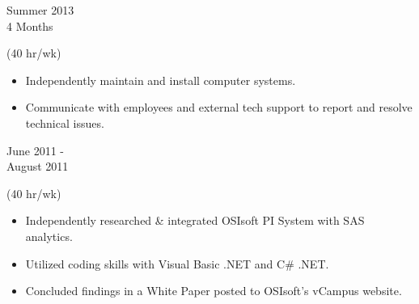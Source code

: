 %


\flushleft \begin{minipage}[t]{\dateColWidth}
Summer 2013 \\
4 Months
\end{minipage}
\begin{minipage}[t]{0.8\textwidth}
 (40 hr/wk) \\[-1 em]
\begin{adjustwidth}{2.5 em}{0 em}

\begin{itemize} \itemsep-2pt
\setlength{\itemindent}{-2 em}

\item Independently maintain and install computer systems.
\item Communicate with employees and external tech support to report and resolve technical issues.

\end{itemize}
\end{adjustwidth}
\end{minipage}

\divLine

\flushleft \begin{minipage}[t]{\dateColWidth}
June 2011 - \\[0.2 em]
August 2011
\end{minipage}
\begin{minipage}[t]{0.8\textwidth}
 (40 hr/wk) \\[-1 em]
\begin{adjustwidth}{2.5 em}{0 em} 

\begin{itemize} \itemsep-2pt
\setlength{\itemindent}{-2 em}

\item Independently researched \& integrated OSIsoft PI System with SAS analytics.
\item Utilized coding skills with Visual Basic .NET and C\# .NET.
\item Concluded findings in a White Paper posted to OSIsoft's vCampus website.
\end{itemize}

\end{adjustwidth}
\end{minipage}

